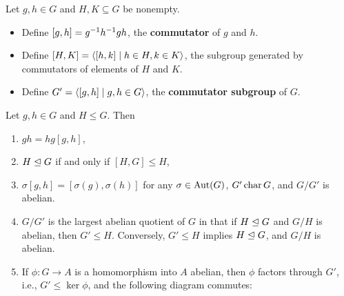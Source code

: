  Let $g, h \in G$ and $H, K \subseteq G$ be nonempty.
\begin{itemize}
    \item Define $[g, h] = g^{-1} h^{-1} gh$, the \textbf{commutator} of $g$ and $h$.
    \item Define $[H, K] = \langle[h, k] \mid h \in H, k \in K\rangle$, the subgroup generated by commutators of elements of $H$ and $K$.
    \item Define $G' = \langle[g, h] \mid g, h \in G\rangle$, the \textbf{commutator subgroup} of $G$.
\end{itemize}

 \label{prop5.7}
Let $g, h \in G$ and $H \leq G$. Then
\begin{enumerate}
    \item $gh = hg[g, h]$,
    \item $H \trianglelefteq G$ if and only if $[H, G] \leq H$,
    \item $\sigma[g, h] = [\sigma(g), \sigma(h)]$ for any $\sigma \in \operatorname{Aut}(G)$, $G' \operatorname{char} G$, and $G/G'$ is abelian.
    \item $G/G'$ is the largest abelian quotient of $G$ in that if $H \trianglelefteq G$ and $G/H$ is abelian, then $G' \leq H$. Conversely, $G' \leq H$ implies $H \trianglelefteq G$, and $G/H$ is abelian.
    \item If $\phi : G \to A$ is a homomorphism into $A$ abelian, then $\phi$ factors through $G'$, i.e., $G' \leq \ker\phi$, and the following diagram commutes:
    \begin{center}
    \end{center}
\end{enumerate}


